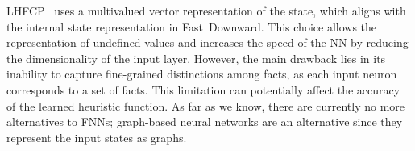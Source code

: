 LHFCP~\cite{Geissmann/2015} uses a multivalued \sas vector representation of the state, which aligns with the internal state representation in Fast~Downward. This choice allows the representation of undefined values and increases the speed of the NN by reducing the dimensionality of the input layer. However, the main drawback lies in its inability to capture fine-grained distinctions among facts, as each input neuron corresponds to a set of facts. This limitation can potentially affect the accuracy of the learned heuristic function. As far as we know, there are currently no more alternatives to FNNs; graph-based neural networks \cite{Shen.etal/2020} are an alternative since they represent the input states as graphs.
